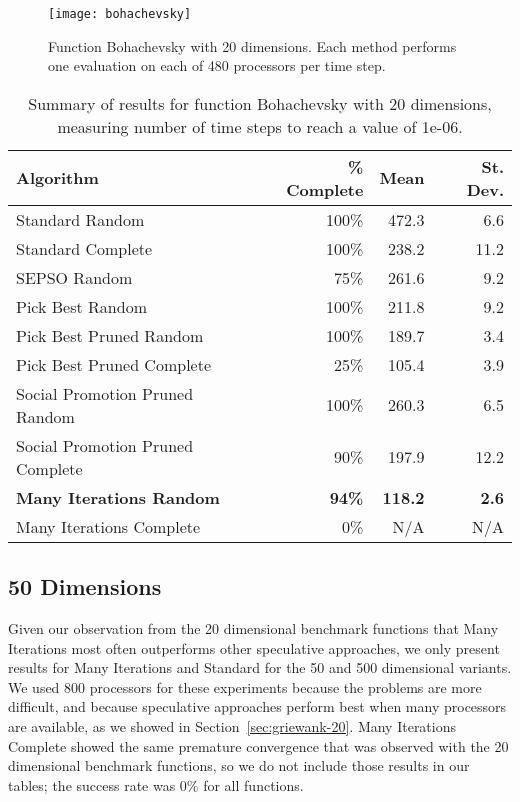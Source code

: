 \documentclass[smallcondensed]{svjour3}
\renewcommand{\sec}[1]{Section~\ref{sec:#1}}
\begin{document}
\begin{figure}
  \centering
  \texttt{[image: bohachevsky]}
  \caption{Function Bohachevsky with 20 dimensions.  Each method performs one
  evaluation on each of 480 processors per time step.}
  \label{fig:bohachevsky}
\end{figure}

\begin{table}
  \caption{Summary of results for function Bohachevsky with 20 dimensions,
  measuring number of time steps to reach a value of 1e-06.}
  \label{tab:bohachevsky-20}
  \centering
  \begin{tabular}{|l|r|r|r|}
  \hline
  Algorithm&\% Complete&Mean&St. Dev.\\
  \hline
  \hline
  Standard Random&100\%&472.3&6.6\\
  \hline
  Standard Complete&100\%&238.2&11.2\\
  \hline
  SEPSO Random&75\%&261.6&9.2\\
  \hline
  Pick Best Random&100\%&211.8&9.2\\
  \hline
  Pick Best Pruned Random&100\%&189.7&3.4\\
  \hline
  Pick Best Pruned Complete&25\%&105.4&3.9\\
  \hline
  Social Promotion Pruned Random&100\%&260.3&6.5\\
  \hline
  Social Promotion Pruned Complete&90\%&197.9&12.2\\
  \hline
  \textbf{Many Iterations Random}&\textbf{94\%}&\textbf{118.2}&\textbf{2.6}\\
  \hline
  Many Iterations Complete&0\%&N/A&N/A\\
  \hline
  \end{tabular}
\end{table}


\subsection{50 Dimensions}
\label{sec:50dims}

Given our observation from the 20 dimensional benchmark functions that Many
Iterations most often outperforms other speculative approaches, we only present
results for Many Iterations and Standard for the 50 and 500 dimensional
variants.  We used 800 processors for these experiments because the problems
are more difficult, and because speculative approaches perform best when many
processors are available, as we showed in \sec{griewank-20}.  Many Iterations
Complete showed the same premature convergence that was observed with the 20
dimensional benchmark functions, so we do not include those results in our
tables; the success rate was 0\% for all functions.
\end{document}
